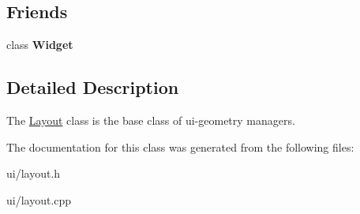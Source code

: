 \subsection*{Friends}
\begin{DoxyCompactItemize}
\item 
\hypertarget{class_tempest_1_1_layout_a29fa75ce3911bef8c5f4414f6f0242b8}{class {\bfseries Widget}}\label{class_tempest_1_1_layout_a29fa75ce3911bef8c5f4414f6f0242b8}

\end{DoxyCompactItemize}


\subsection{Detailed Description}
The \hyperlink{class_tempest_1_1_layout}{Layout} class is the base class of ui-\/geometry managers. 

The documentation for this class was generated from the following files\+:\begin{DoxyCompactItemize}
\item 
ui/layout.\+h\item 
ui/layout.\+cpp\end{DoxyCompactItemize}
